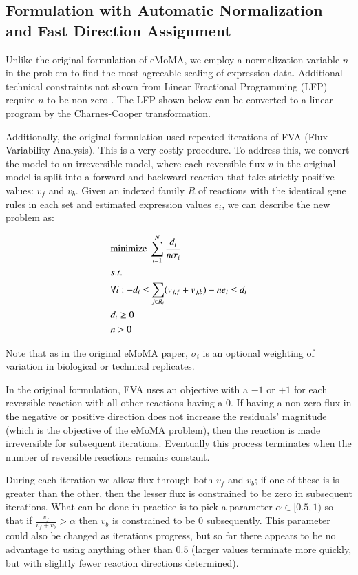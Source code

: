 \documentclass[phd,tocprelim]{cornell}
\theoremstyle{break}
\begin{document}
\subsection{Formulation with Automatic Normalization and Fast Direction Assignment}
Unlike the original formulation of eMoMA, we employ a normalization variable $n$ in the problem
to find the most agreeable scaling of expression data. Additional technical constraints not shown
from Linear Fractional Programming (LFP) require $n$ to be non-zero \cite{Boyd2004}. The
LFP shown below can be converted to a linear program by the Charnes-Cooper transformation.

Additionally, the original formulation
used repeated iterations of FVA (Flux Variability Analysis). This is a very costly procedure. 
To address this, we convert the model to an irreversible model, where each reversible flux $v$
in the original model is split into a forward and backward reaction that take strictly positive
values: $v_f$ and $v_b$. Given an indexed family $R$ of reactions with the identical gene rules in each
set and estimated expression values $e_i$, we can describe the new problem as:

\begin{align*}
&\textnormal{minimize}\ \sum^N_{i=1}\frac{d_i}{n \sigma_i}  \\
&s.t. \\
&\forall i: -d_i \leq \sum_{j \in R_i}(v_{j,f} + v_{j,b}) - n e_i \leq d_i \\
&d_i \geq 0 \\
&n > 0
\end{align*}

Note that as in the original eMoMA paper, $\sigma_i$ is an optional weighting of variation
in biological or technical replicates. 

In the original formulation, FVA uses an objective with a $-1$ or $+1$ for each reversible reaction 
with all other reactions having a 0. If having a non-zero flux in the negative or positive direction
does not increase the residuals' magnitude (which is the objective of the eMoMA problem), then 
the reaction is made irreversible for subsequent iterations. Eventually this process terminates
when the number of reversible reactions remains constant. 

During each iteration we allow flux through both $v_f$ and $v_b$; if one of these is is greater 
than the other, then the lesser flux is constrained to be zero in subsequent iterations. What
can be done in practice is to pick a parameter $\alpha \in [0.5,1)$ so that if
$\frac{v_f}{v_f+v_b} > \alpha$ then $v_b$ is constrained to be 0 subsequently. This parameter could
also be changed as iterations progress, but so far there appears to be no advantage to using
anything other than $0.5$ (larger values terminate more quickly, but with slightly fewer reaction
directions determined).
\end{document}
